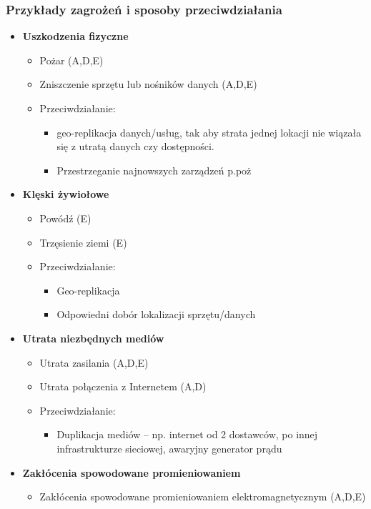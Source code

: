 \subsubsection{Przykłady zagrożeń i sposoby przeciwdziałania}

\begin{itemize}
	\item \textbf{Uszkodzenia fizyczne}
	\begin{itemize}
		\item Pożar (A,D,E)
		\item Zniszczenie sprzętu lub nośników danych (A,D,E)
		\item Przeciwdziałanie:
		\begin{itemize}
			\item geo-replikacja danych/usług, tak aby strata jednej lokacji nie wiązała się z utratą danych czy dostępności.
			\item Przestrzeganie najnowszych zarządzeń p.poż
		\end{itemize}
	\end{itemize}
	\item \textbf{Klęski żywiołowe}
	\begin{itemize}
		\item Powódź (E)
		\item Trzęsienie ziemi (E)
		\item Przeciwdziałanie:
		\begin{itemize}
			\item Geo-replikacja
			\item Odpowiedni dobór lokalizacji sprzętu/danych
		\end{itemize}
	\end{itemize}
	\item \textbf{Utrata niezbędnych mediów}
	\begin{itemize}
		\item Utrata zasilania (A,D,E)
		\item Utrata połączenia z Internetem (A,D)
		\item Przeciwdziałanie:
		\begin{itemize}
			\item Duplikacja mediów – np. internet od 2 dostawców, po innej infrastrukturze sieciowej, awaryjny generator prądu
		\end{itemize}
	\end{itemize}
	\item \textbf{Zakłócenia spowodowane promieniowaniem}
	\begin{itemize}
		\item Zakłócenia spowodowane promieniowaniem elektromagnetycznym (A,D,E)

\end{itemize}
\end{itemize}
